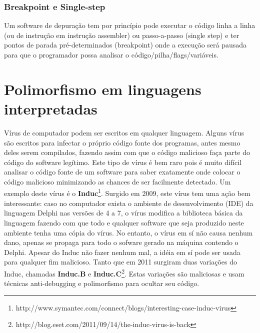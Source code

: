 \subsubsection{Breakpoint e Single-step}
Um software de depuração tem por princípio pode executar o código linha a linha (ou de instrução em instrução assembler) ou passo-a-passo (single step) e ter pontos de parada pré-determinados (breakpoint) onde a execução será pausada para que o programador possa analisar o código/pilha/flags/variáveis. 



\section{Polimorfismo em linguagens interpretadas}

Vírus de computador podem ser escritos em qualquer linguagem. Alguns vírus são escritos para infectar o próprio código fonte dos programas, antes mesmo deles serem compilados, fazendo assim com que o código malicioso faça parte do código do software legítimo. Este tipo de vírus é bem raro pois é muito difícil analisar o código fonte de um software para saber exatamente onde colocar o código malicioso minimizando as chances de ser facilmente detectado. Um exemplo deste vírus é o \textbf{Induc}\footnote{http://www.symantec.com/connect/blogs/interesting-case-induc-virus}. Surgido em 2009, este vírus tem uma ação bem interessante: caso no computador exista o ambiente de desenvolvimento (IDE) da linguagem Delphi\textsuperscript{\textregistered} nas versões de 4 a 7, o vírus modifica a biblioteca básica da linguagem fazendo com que todo e qualquer software que seja produzido neste ambiente tenha uma cópia do vírus. No entanto, o vírus em sí não causa nenhum dano, apenas se propaga para todo o sofware gerado na máquina contendo o Delphi. Apesar do Induc não fazer nenhum mal, a idéia em sí pode ser usada para qualquer fim malicioso. Tanto que em 2011 surgiram duas variações do Induc, chamadas \textbf{Induc.B} e \textbf{Induc.C}\footnote{http://blog.eset.com/2011/09/14/the-induc-virus-is-back}. Estas variações são maliciosas e usam técnicas anti-debugging e polimorfismo para ocultar seu código.

